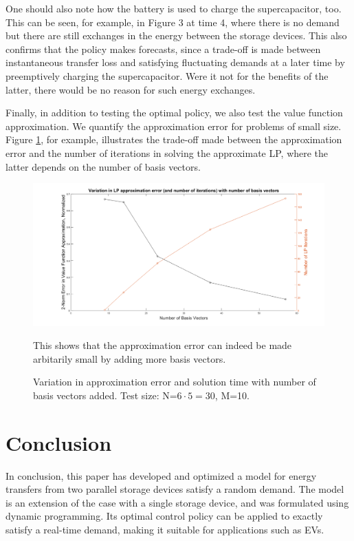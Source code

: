 \documentclass[conference]{IEEEtran}
\begin{document}
One should also note how the battery is used to charge the supercapacitor, too. This can be seen, for example, in Figure 3 at time 4, where there is no demand but there are still exchanges in the energy between the storage devices. This also confirms that the policy makes forecasts, since a trade-off is made between instantaneous transfer loss and satisfying fluctuating demands at a later time by preemptively charging the supercapacitor. Were it not for the benefits of the latter, there would be no reason for such energy exchanges.

Finally, in addition to testing the optimal policy, we also test the value function approximation. We quantify the approximation error for problems of small size. Figure \ref{fig:ApproxVsIter}, for example, illustrates the trade-off made between the approximation error and the number of iterations in solving the approximate LP, where the latter depends on the number of basis vectors.

\begin{figure}[htbp]
\centerline{\includegraphics[scale=0.25]{ApproxErr_vs_NumIter.png}}
\caption{Variation in approximation error and solution time with number of basis vectors added. Test size: N=$6\cdot5=30$, M=10.}
\label{fig:ApproxVsIter}This shows that the approximation error can indeed be made arbitarily small by adding more basis vectors.
\end{figure}



\section{Conclusion}
In conclusion, this paper has developed and optimized a model for energy transfers from two parallel storage devices satisfy a random demand. The model is an extension of the case with a single storage device, and was formulated using dynamic programming. Its optimal control policy can be applied to exactly satisfy a real-time demand, making it suitable for applications such as EVs.
\end{document}
